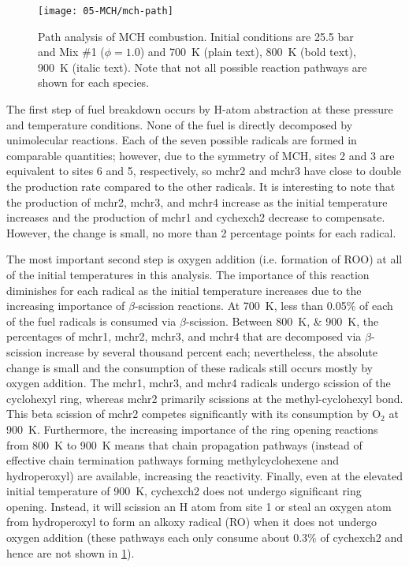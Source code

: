 \documentclass[../main.tex]{subfiles}
\begin{document}
\begin{figure}
    \texttt{[image: 05-MCH/mch-path]}
    \caption{Path analysis of MCH combustion. Initial conditions are 25.5 bar
    and Mix \#1 ($\phi=\num{1.0}$) and \SI{700}{\kelvin} (plain text),
    \SI{800}{\kelvin} (bold text), \SI{900}{\kelvin} (italic text).
    Note that not all possible reaction pathways are shown for
    each species.}
    \label{fig:mch-path}
\end{figure}

The first step of fuel breakdown occurs by H-atom abstraction at these pressure
and temperature conditions. None of the fuel is directly decomposed by
unimolecular reactions. Each of the seven possible radicals are formed in
comparable quantities; however, due to the symmetry of MCH, sites 2 and 3 are
equivalent to sites 6 and 5, respectively, so mchr2 and mchr3 have close to
double the production rate compared to the other radicals. It is interesting to
note that the production of mchr2, mchr3, and mchr4 increase as the initial
temperature increases and the production of mchr1 and cychexch2 decrease to
compensate. However, the change is small, no more than 2 percentage points for
each radical.

The most important second step is oxygen addition (i.e. formation of ROO) at
all of the initial temperatures in this analysis. The importance of this
reaction diminishes for each radical as the initial temperature increases due
to the increasing importance of $\beta$-scission reactions. At \SI{700}{\kelvin}, less than
0.05\% of each of the fuel radicals is consumed via $\beta$-scission. Between
\SIlist{800;900}{\kelvin}, the percentages of mchr1, mchr2, mchr3, and mchr4 that are decomposed
via $\beta$-scission increase by several thousand percent each; nevertheless,
the absolute change is small and the consumption of these radicals still occurs
mostly by oxygen addition. The mchr1, mchr3, and mchr4 radicals undergo
scission of the cyclohexyl ring, whereas mchr2 primarily scissions at the
methyl-cyclohexyl bond. This beta scission of mchr2 competes significantly with
its consumption by O$_2$ at \SI{900}{\kelvin}. Furthermore, the increasing importance of the
ring opening reactions from \SI{800}{\kelvin} to \SI{900}{\kelvin} means that chain propagation pathways
(instead of effective chain termination pathways forming methylcyclohexene and
hydroperoxyl) are available, increasing the reactivity. Finally, even at the
elevated initial temperature of \SI{900}{\kelvin}, cychexch2 does not undergo significant
ring opening. Instead, it will scission an H atom from site 1 or steal an oxygen
atom from hydroperoxyl to form an alkoxy radical (RO) when it does not undergo
oxygen addition (these pathways each only consume about 0.3\% of cychexch2 and
hence are not shown in \cref{fig:mch-path}).
\end{document}
